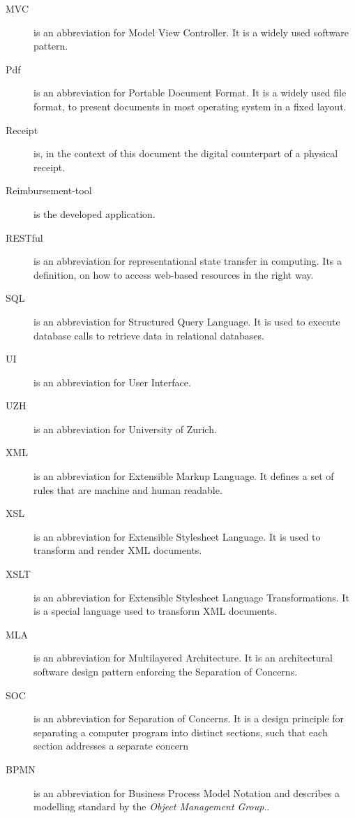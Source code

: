 \begin{description}
    \item[MVC] is an abbreviation for Model View Controller. It is a widely used software pattern.
    \item[Pdf] is an abbreviation for Portable Document Format. It is a widely used file format, to present documents in most operating system in a fixed layout.
    \item[Receipt] is, in the context of this document the digital counterpart of a physical receipt.
    \item[Reimbursement-tool] is the developed application.
    \item[RESTful] is an abbreviation for representational state transfer in computing. Its a definition, on how to access web-based resources in the right way.
    \item[SQL] is an abbreviation for Structured Query Language. It is used to execute database calls to retrieve data in relational databases.
    \item[UI] is an abbreviation for User Interface. 
    \item[UZH] is an abbreviation for University of Zurich.
    \item[XML] is an abbreviation for Extensible Markup Language. It defines a set of rules that are machine and human readable.
    \item[XSL] is an abbreviation for Extensible Stylesheet Language. It is used to transform and render XML documents.
    \item[XSLT] is an abbreviation for Extensible Stylesheet Language Transformations. It is a special language used to transform XML documents.
    \item[MLA] is an abbreviation for Multilayered Architecture. It is an architectural software design pattern enforcing the Separation of Concerns.
    \item[SOC] is an abbreviation for Separation of Concerns. It is a design principle for separating a computer program into distinct sections, such that each section addresses a separate concern\cite{soc}
    \item[BPMN] is an abbreviation for Business Process Model Notation and describes a modelling standard by the \textit{Object Management Group}\cite{bpmn}..
\end{description}
